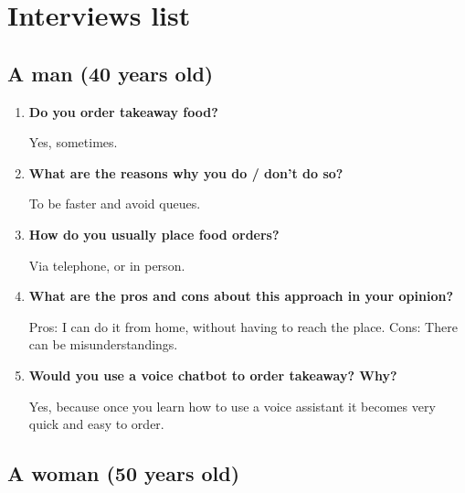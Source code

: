 \section{Interviews list}


\subsection*{A man (40 years old)}

\begin{enumerate}

\item \textbf{Do you order takeaway food?}

Yes, sometimes.

\item \textbf{What are the reasons why you do / don't do so?}

To be faster and avoid queues.

\item \textbf{How do you usually place food orders?}

Via telephone, or in person.

\item \textbf{What are the pros and cons about this approach in your opinion?}

Pros: I can do it from home, without having to reach the place.
Cons: There can be misunderstandings.

\item \textbf{Would you use a voice chatbot to order takeaway? Why?}

Yes, because once you learn how to use a voice assistant it becomes very quick and easy to order.

\end{enumerate}


\subsection*{A woman (50 years old)}

